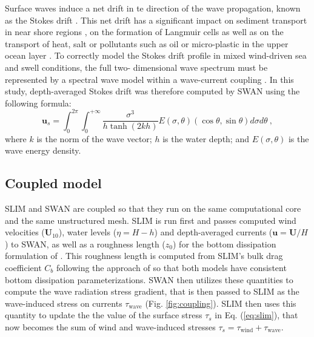 \documentclass[11pt,a4paper]{article}
\begin{document}
Surface waves induce a net drift in te direction of the wave propagation, known as the Stokes drift \citep{van2018stokes,stokes1880theory}. This net drift has a significant impact on sediment transport in near shore regions \citep{hoefel2003wave}, on the formation of Langmuir cells \citep{langmuir1938surface, craik1976rational} as well as on the transport of heat, salt or pollutants such as oil or micro-plastic in the upper ocean layer \citep{mcwilliams2000vertical,rohrs2012observation,drivdal2014wave}. To correctly model the Stokes drift profile in mixed wind-driven sea and swell conditions, the full two- dimensional wave spectrum must be represented by a spectral wave model within a wave-current coupling \citep{van2018stokes}. In this study, depth-averaged Stokes drift was therefore computed by SWAN using the following formula:
\begin{equation}
    \mathbf{u}_{s} = \int_0^{2\pi}\int_0^{+\infty} \dfrac{\sigma^3}{h\tanh(2kh)}E(\sigma,\theta)(\cos\theta, \sin\theta)d\sigma d\theta~, \label{eq:stokes}
\end{equation}
where $k$ is the norm of the wave vector; $h$ is the water depth; and $E(\sigma,\theta)$ is the wave energy density.

\subsection{Coupled model}

SLIM and SWAN are coupled so that they run on the same computational core and the same unstructured mesh. SLIM is run first and passes computed wind velocities ($\mathbf{U}_{10}$), water levels ($\eta=H-h$) and depth-averaged currents ($\mathbf{u}=\mathbf{U}/H$) to SWAN, as well as a roughness length ($z_0$) for the bottom dissipation formulation of \cite{madsen1989spectral}. This roughness length is computed from SLIM's bulk drag coefficient $C_b$ following the approach of \cite{dietrich2011hurricane} so that both models have consistent bottom dissipation parameterizations. SWAN then utilizes these quantities to compute the wave radiation stress gradient, that is then passed to SLIM as the wave-induced stress on currents {\boldmath$\tau$}$_\text{wave}$ (Fig. \ref{fig:coupling}). SLIM then uses this quantity to update the the value of the surface stress {\boldmath$\tau$}$_s$ in Eq. (\ref{eq:slim}), that now becomes the sum of wind and wave-induced stresses {\boldmath$\tau$}$_s=${\boldmath$\tau$}$_\text{wind}+${\boldmath$\tau$}$_\text{wave}$.
\end{document}
